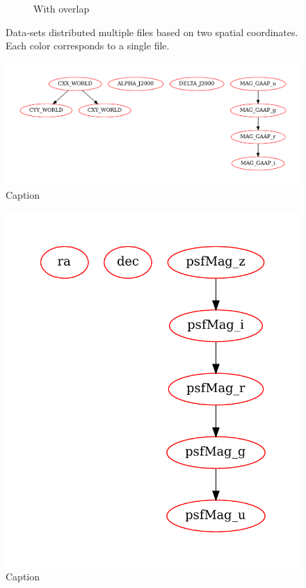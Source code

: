 \begin{figure}[htbp]
\begin{subfigure}[]{0.5\textwidth}
    \caption{With overlap}\label{subfig:mer_multifile}
    \end{subfigure}
    \caption{
        Data-sets distributed multiple files based on two spatial coordinates.
        Each color corresponds to a single file.
    }
    \label{fig:tree_cat_cut}
\end{figure}

\begin{figure}[htbp]
    \centering
    \includegraphics[width=\linewidth]{images/A2_prototypes/png_kids.pdf}
    \caption{Caption}
    \label{fig:prototype_png_kids}
\end{figure}

\begin{figure}[htbp]
    \centering
    \includegraphics[width=\linewidth]{images/A2_prototypes/png_sdss.pdf}
    \caption{Caption}
    \label{fig:prototype_png_sdss}
\end{figure}